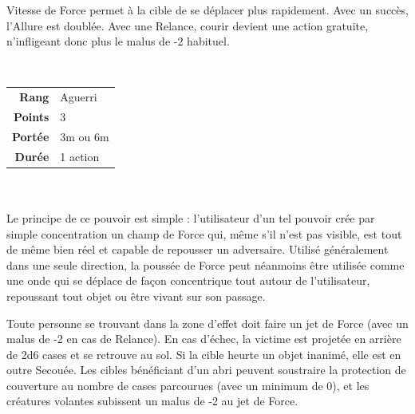 \begin{description}[align=left]
        Vitesse de Force permet à la cible de se déplacer plus rapidement. Avec un succès, l’Allure est doublée. Avec une Relance, courir devient une action gratuite, n’infligeant donc plus le malus de -2 habituel. 
        \\

    \item [Poussée de Force] ~ \\

        \begin{tabular}{ r l }
            \textbf{Rang}    & Aguerri \\
            \textbf{Points}  & 3 \\
            \textbf{Portée}  & 3m ou 6m \\
            \textbf{Durée}   & 1 action \\
        \end{tabular}
        \\ \\
        Le principe de ce pouvoir est simple : l’utilisateur d’un tel pouvoir crée par simple concentration un champ de Force qui, même s’il n’est pas visible, est tout de même bien réel et capable de repousser un adversaire. Utilisé généralement dans une seule direction, la poussée de Force peut néanmoins être utilisée comme une onde qui se déplace de façon concentrique tout autour de l’utilisateur, repoussant tout objet ou être vivant sur son passage. 

        Toute personne se trouvant dans la zone d’effet doit faire un jet de Force (avec un malus de -2 en cas de Relance). En cas d’échec, la victime est projetée en arrière de 2d6 cases et se retrouve au sol. Si la cible heurte un objet inanimé, elle est en outre Secouée. Les cibles bénéficiant d’un abri peuvent soustraire la protection de couverture au nombre de cases parcourues (avec un minimum de 0), et les créatures volantes subissent un malus de -2 au jet de Force.
        \\

\end{description}

